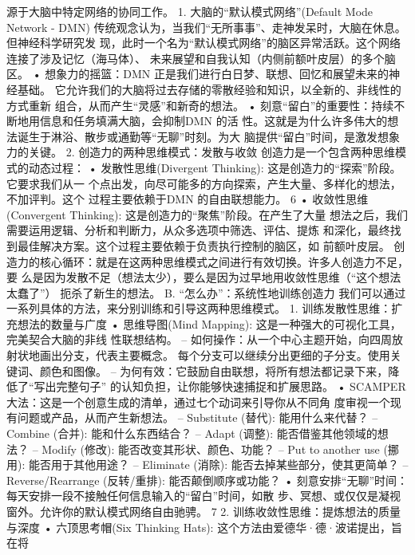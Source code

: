 \documentclass[a4paper,12pt]{article}
\begin{document}
\begin{multicols}{2}
    源于大脑中特定网络的协同工作。 1. 大脑的``默认模式网络''(Default
    Mode Network - DMN)
    传统观念认为，当我们``无所事事''、走神发呆时，大脑在休息。但神经科学研究发
    现，此时一个名为``默认模式网络''的脑区异常活跃。这个网络连接了涉及记忆（海马体）、
    未来展望和自我认知（内侧前额叶皮层）的多个脑区。 • 想象力的摇篮：DMN
    正是我们进行白日梦、联想、回忆和展望未来的神经基础。
    它允许我们的大脑将过去存储的零散经验和知识，以全新的、非线性的方式重新
    组合，从而产生``灵感''和新奇的想法。 •
    刻意``留白''的重要性：持续不断地用信息和任务填满大脑，会抑制DMN 的活
    性。这就是为什么许多伟大的想法诞生于淋浴、散步或通勤等``无聊''时刻。为大
    脑提供``留白''时间，是激发想象力的关键。 2.
    创造力的两种思维模式：发散与收敛
    创造力是一个包含两种思维模式的动态过程： • 发散性思维(Divergent
    Thinking): 这是创造力的``探索''阶段。它要求我们从一
    个点出发，向尽可能多的方向探索，产生大量、多样化的想法，不加评判。这个
    过程主要依赖于DMN 的自由联想能力。 6 • 收敛性思维(Convergent
    Thinking): 这是创造力的``聚焦''阶段。在产生了大量
    想法之后，我们需要运用逻辑、分析和判断力，从众多选项中筛选、评估、提炼
    和深化，最终找到最佳解决方案。这个过程主要依赖于负责执行控制的脑区，如
    前额叶皮层。
    创造力的核心循环：就是在这两种思维模式之间进行有效切换。许多人创造力不足，要
    么是因为发散不足（想法太少），要么是因为过早地用收敛性思维（``这个想法太蠢了''）
    扼杀了新生的想法。 B. ``怎么办''：系统性地训练创造力
    我们可以通过一系列具体的方法，来分别训练和引导这两种思维模式。 1.
    训练发散性思维：扩充想法的数量与广度 • 思维导图(Mind Mapping):
    这是一种强大的可视化工具，完美契合大脑的非线 性联想结构。 --
    如何操作：从一个中心主题开始，向四周放射状地画出分支，代表主要概念。
    每个分支可以继续分出更细的子分支。使用关键词、颜色和图像。 --
    为何有效：它鼓励自由联想，将所有想法都记录下来，降低了``写出完整句子''
    的认知负担，让你能够快速捕捉和扩展思路。 • SCAMPER
    大法：这是一个创意生成的清单，通过七个动词来引导你从不同角
    度审视一个现有问题或产品，从而产生新想法。 -- Substitute (替代):
    能用什么来代替？ -- Combine (合并): 能和什么东西结合？ -- Adapt
    (调整): 能否借鉴其他领域的想法？ -- Modify (修改):
    能否改变其形状、颜色、功能？ -- Put to another use (挪用):
    能否用于其他用途？ -- Eliminate (消除):
    能否去掉某些部分，使其更简单？ -- Reverse/Rearrange (反转/重排):
    能否颠倒顺序或功能？ •
    刻意安排``无聊''时间：每天安排一段不接触任何信息输入的``留白''时间，如散
    步、冥想、或仅仅是凝视窗外。允许你的默认模式网络自由驰骋。 7 2.
    训练收敛性思维：提炼想法的质量与深度 • 六顶思考帽(Six Thinking
    Hats): 这个方法由爱德华·德·波诺提出，旨在将

\end{multicols}
\end{document}
